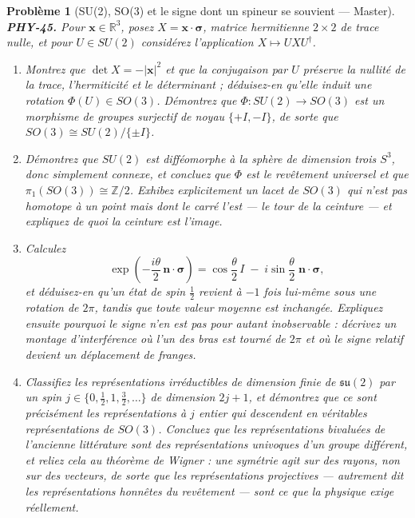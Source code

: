 \documentclass[11pt]{article}
\newtheorem{problem}{Problème}
\begin{document}
\begin{problem}[{SU(2), SO(3) et le signe dont un spineur se souvient --- Master}]
\textbf{PHY-45.} Pour $\mathbf{x}\in\mathbb{R}^3$, posez
$X = \mathbf{x}\cdot\boldsymbol{\sigma}$, matrice hermitienne $2\times 2$ de trace nulle, et
pour $U \in SU(2)$ considérez l'application $X \mapsto U X U^{\dagger}$.
\begin{enumerate}
\item[(a)] Montrez que $\det X = -|\mathbf{x}|^{2}$ et que la conjugaison par $U$ préserve la nullité
de la trace, l'hermiticité et le déterminant ; déduisez-en qu'elle induit une rotation
$\Phi(U)\in SO(3)$. Démontrez que $\Phi : SU(2) \to SO(3)$ est un morphisme de groupes
surjectif de noyau $\{+I, -I\}$, de sorte que $SO(3) \cong SU(2)/\{\pm I\}$.
\item[(b)] Démontrez que $SU(2)$ est difféomorphe à la sphère de dimension trois $S^{3}$, donc
simplement connexe, et concluez que $\Phi$ est le revêtement universel et que
$\pi_1(SO(3)) \cong \mathbb{Z}/2$. Exhibez explicitement un lacet de $SO(3)$ qui n'est pas
homotope à un point mais dont le carré l'est --- le tour de la ceinture --- et expliquez de quoi la
ceinture est l'image.
\item[(c)] Calculez
\[ \exp\!\left(-\frac{i\theta}{2}\,\mathbf{n}\cdot\boldsymbol{\sigma}\right)
= \cos\frac{\theta}{2}\,I \;-\; i\sin\frac{\theta}{2}\;\mathbf{n}\cdot\boldsymbol{\sigma}, \]
et déduisez-en qu'un état de spin $\tfrac12$ revient à $-1$ fois lui-même sous une rotation de
$2\pi$, tandis que toute valeur moyenne est inchangée. Expliquez ensuite pourquoi le signe n'en
est pas pour autant inobservable : décrivez un montage d'interférence où l'un des bras est tourné
de $2\pi$ et où le signe relatif devient un déplacement de franges.
\item[(d)] Classifiez les représentations irréductibles de dimension finie de $\mathfrak{su}(2)$ par un
spin $j \in \{0,\tfrac12,1,\tfrac32,\dots\}$ de dimension $2j+1$, et démontrez que ce sont
précisément les représentations à $j$ entier qui descendent en véritables représentations de
$SO(3)$. Concluez que les \og{} représentations bivaluées \fg{} de l'ancienne littérature sont des
représentations univoques d'un groupe différent, et reliez cela au théorème de Wigner : une
symétrie agit sur des rayons, non sur des vecteurs, de sorte que les représentations projectives ---
autrement dit les représentations honnêtes du revêtement --- sont ce que la physique exige
réellement.
\end{enumerate}

\end{problem}
\end{document}
